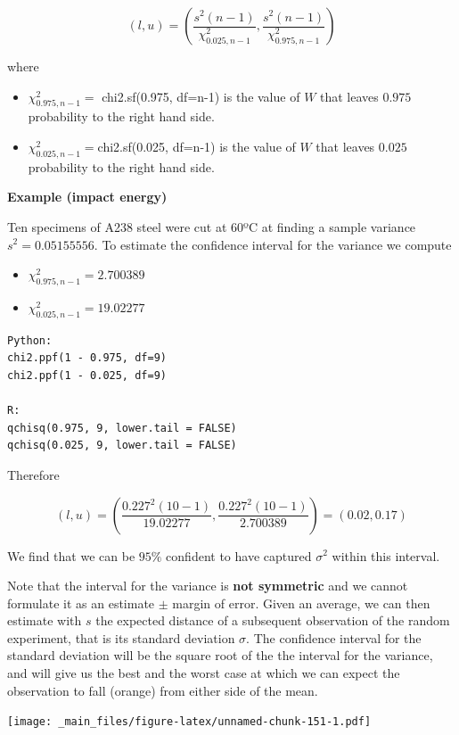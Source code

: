 \documentclass[
]{book}
\begin{document}
\[(l,u) = (\frac{s^2 (n-1)}{\chi^2_{0.025,n-1}},\frac{s^2(n-1)}{\chi^2_{0.975,n-1}})\]

where

\begin{itemize}
\item
  \(\chi^2_{0.975,n-1}=\) chi2.sf(0.975, df=n-1) is the value of \(W\) that leaves \(0.975\) probability to the right hand side.
\item
  \(\chi^2_{0.025,n-1}=\)chi2.sf(0.025, df=n-1) is the value of \(W\) that leaves \(0.025\) probability to the right hand side.
\end{itemize}

\textbf{Example (impact energy)}

Ten specimens of A238 steel were cut at 60ºC at finding a sample variance \(s^2=0.05155556\). To estimate the confidence interval for the variance we compute

\begin{itemize}
\item
  \(\chi^2_{0.975,n-1}=2.700389\)
\item
  \(\chi^2_{0.025,n-1}=19.02277\)
\end{itemize}

\begin{verbatim}
Python:
chi2.ppf(1 - 0.975, df=9) 
chi2.ppf(1 - 0.025, df=9)

R: 
qchisq(0.975, 9, lower.tail = FALSE)
qchisq(0.025, 9, lower.tail = FALSE)
\end{verbatim}

Therefore

\[(l,u)= (\frac{0.227^2 (10-1)}{19.02277},\frac{0.227^2(10-1)}{2.700389})=(0.02,0.17)\]

We find that we can be \(95\%\) confident to have captured \(\sigma^2\) within this interval.

Note that the interval for the variance is \textbf{not symmetric} and we cannot formulate it as an estimate \(\pm\) margin of error. Given an average, we can then estimate with \(s\) the expected distance of a subsequent observation of the random experiment, that is its standard deviation \(\sigma\). The confidence interval for the standard deviation will be the square root of the the interval for the variance, and will give us the best and the worst case at which we can expect the observation to fall (orange) from either side of the mean.

\texttt{[image: \_main\_files/figure-latex/unnamed-chunk-151-1.pdf]}
\end{document}
